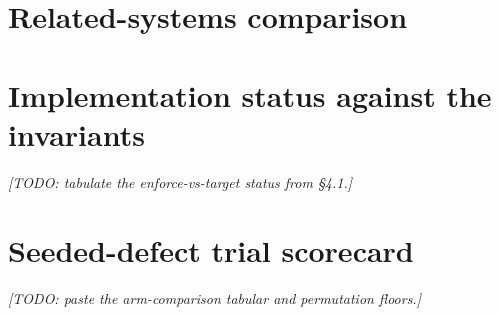 \documentclass[10pt]{article}
\begin{document}
\section{Related-systems comparison}
\begin{center}\footnotesize\setlength{\tabcolsep}{3.5pt}

\end{center}
\section{Implementation status against the invariants}
\emph{[TODO: tabulate the enforce-vs-target status from \S4.1.]}
\section{Seeded-defect trial scorecard}
\emph{[TODO: paste the arm-comparison tabular and permutation floors.]}
\end{document}
